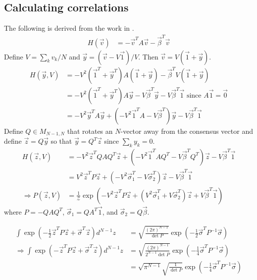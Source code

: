 \documentclass{article}
\newcommand{\z}{\mathscr{Z}}
\begin{document}
\subsection{Calculating correlations \label{corr}}
The following is derived from the work in \cite{Bialek:2013fk}.
\begin{align*}
H(\vec{v})&=-\vec{v}^TA\vec{v}-\vec{\beta}^T\vec{v}
\end{align*}
Define $V=\sum_kv_k/N$ and $\vec{y}=(\vec{v}-V\vec{1})/V$.  Then $\vec{v}=V(\vec{1}+\vec{y})$.  
\begin{align*}
H(\vec{y},V)&=-V^2(\vec{1}^T+\vec{y}^T)A(\vec{1}+\vec{y})-\vec{\beta}^TV(\vec{1}+\vec{y})
\\&=-V^2(\vec{1}^T+\vec{y}^T)A\vec{y}-V\vec{\beta}^T\vec{y}-V\vec{\beta}^T\vec{1} \text{ since $A\vec{1}=\vec{0}$}
\\&=-V^2\vec{y}^TA\vec{y}+(-V^2\vec{1}^TA-V\vec{\beta}^T)\vec{y}-V\vec{\beta}^T\vec{1}
\end{align*}
Define $Q\in M_{N-1,N}$ that rotates an $N$-vector away from the consensus vector and define $\vec{z}=Q\vec{y}$ so that $\vec{y}=Q^T\vec{z}$ since $\sum_ky_k=0$.
\begin{align*}
H(\vec{z},V)&=-V^2\vec{z}^TQAQ^T\vec{z}+(-V^2\vec{1}^TAQ^T-V\vec{\beta}^TQ^T)\vec{z}-V\vec{\beta}^T\vec{1}
\\&=V^2\vec{z}^TP\vec{z}+(-V^2\vec{\sigma}_1^T-V\vec{\sigma}_2^T)\vec{z}-V\vec{\beta}^T\vec{1}
\\ \Rightarrow P(\vec{z},V)&=\frac{1}{\z}\exp\left(-V^2\vec{z}^TP\vec{z}+(V^2\vec{\sigma}_1^T+V\vec{\sigma}_2^T)\vec{z}+V\vec{\beta}^T\vec{1}\right)
\end{align*}
where $P=-QAQ^T$, $\vec{\sigma}_1=QA^T\vec{1}$, and $\vec{\sigma}_2=Q\vec{\beta}$.


\begin{fact}
\begin{align*}
\int\exp\left(-\frac{1}{2}\vec{z}^TP\vec{z}+\vec{\sigma}^T\vec{z}\right)d^{N-1}z&=\sqrt{\frac{(2\pi)^{N-1}}{\det P}}\exp\left(-\frac{1}{2}\vec{\sigma}^TP^{-1}\vec{\sigma}\right)
\\\Rightarrow \int\exp\left(-\vec{z}^TP\vec{z}+\vec{\sigma}^T\vec{z}\right)d^{N-1}z&=\sqrt{\frac{(2\pi)^{N-1}}{2^{N-1}\det P}}\exp\left(-\frac{1}{4}\vec{\sigma}^TP^{-1}\vec{\sigma}\right)
\\&=\sqrt{\pi^{N-1}}\sqrt{\frac{1}{\det P}}\exp\left(-\frac{1}{4}\vec{\sigma}^TP^{-1}\vec{\sigma}\right)
\end{align*}
\end{fact}
\end{document}

